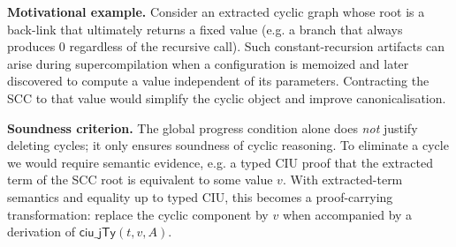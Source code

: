 \textbf{Motivational example.}
Consider an extracted cyclic graph whose root is a back-link that ultimately returns a fixed value (e.g. a branch that always produces \(0\) regardless of the recursive call).
Such constant-recursion artifacts can arise during supercompilation when a configuration is memoized and later discovered to compute a value independent of its parameters.
Contracting the SCC to that value would simplify the cyclic object and improve canonicalisation.

\textbf{Soundness criterion.}
The global progress condition alone does \emph{not} justify deleting cycles; it only ensures soundness of cyclic reasoning.
To eliminate a cycle we would require semantic evidence, e.g. a typed CIU proof that the extracted term of the SCC root is equivalent to some value \(v\).
With extracted-term semantics and equality up to typed CIU, this becomes a proof-carrying transformation: replace the cyclic component by \(v\) when accompanied by a derivation of \(\mathsf{ciu\_jTy}(t,v,A)\).
